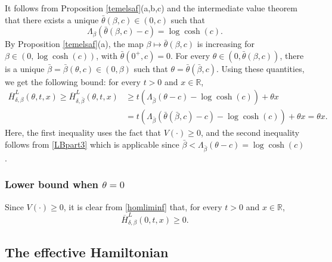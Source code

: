 \documentclass[a4paper]{amsart}
\numberwithin{equation}{section}
\theoremstyle{plain}
\theoremstyle{remark}
\begin{document}
It follows from Proposition \ref{temelsaf}(a,b,c) and the intermediate value theorem that there exists a unique $\bar\theta(\beta,c)\in(0,c)$ such that
$$\Lambda_\beta(\bar\theta(\beta,c)-c) = \log\cosh(c).$$
By Proposition \ref{temelsaf}(a), the map $\beta\mapsto\bar\theta(\beta,c)$ is increasing for $\beta\in(0,\log\cosh(c))$, with $\bar{\theta}(0^+,c) = 0$. For every $\theta\in(0,\bar\theta(\beta,c))$, there is a unique $\bar\beta = \bar\beta(\theta,c) \in(0,\beta)$ such that $\theta = \bar\theta(\bar\beta,c)$. Using these quantities, we get the following bound: for every $t>0$ and $x\in\mathbb{R}$,
\begin{equation}
\begin{aligned}\label{LBpart4}
\overline H_{\delta,\beta}^L(\theta,t,x) \ge \overline H_{\delta,\bar\beta}^L(\theta,t,x) &\ge t(\Lambda_{\bar\beta}(\theta - c) - \log\cosh(c)) + \theta x\\
&= t(\Lambda_{\bar\beta}(\bar\theta(\bar\beta,c) - c) - \log\cosh(c)) + \theta x = \theta x.
\end{aligned}
\end{equation}
Here, the first inequality uses the fact that $V(\cdot)\ge0$, and the second inequality follows from \eqref{LBpart3} which is applicable since $\bar\beta < \Lambda_{\bar\beta}(\theta - c) = \log\cosh(c)$.

\subsubsection{Lower bound when $\theta = 0$}

Since $V(\cdot)\ge0$, it is clear from \eqref{homliminf} that, for every $t>0$ and $x\in\mathbb{R}$,
\begin{equation}\label{LBpart5}
\overline H_{\delta,\beta}^L(0,t,x)\ge 0.
\end{equation}

\subsection{The effective Hamiltonian}
\end{document}
